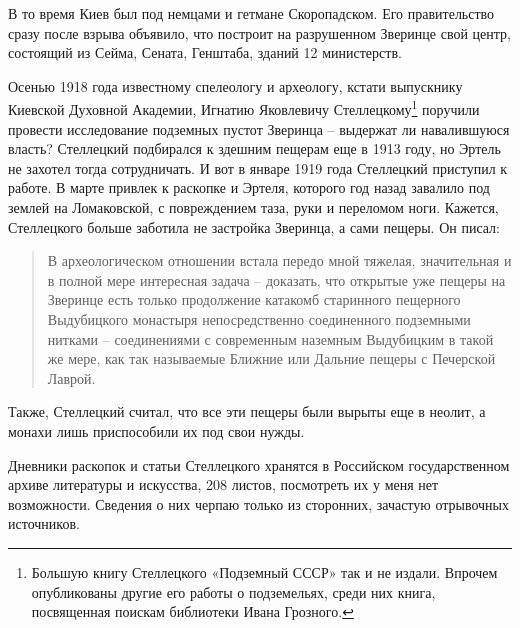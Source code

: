 В то время Киев был под немцами и гетмане Скоропадском. Его правительство сразу после взрыва объявило, что построит на разрушенном Зверинце свой центр, состоящий из Сейма, Сената, Генштаба, зданий 12 министерств.

Осенью 1918 года известному спелеологу и археологу, кстати выпускнику Киевской Духовной Академии, Игнатию Яковлевичу Стеллецкому\footnote{Большую книгу Стеллецкого «Подземный СССР» так и не издали. Впрочем опубликованы другие его работы о подземельях, среди них книга, посвященная поискам библиотеки Ивана Грозного.} поручили провести исследование подземных пустот Зверинца – выдержат ли навалившуюся власть? Стеллецкий подбирался к здешним пещерам еще в 1913 году, но Эртель не захотел тогда сотрудничать. И вот в январе 1919 года Стеллецкий приступил к работе. В марте привлек к раскопке и Эртеля, которого год назад завалило под землей на Ломаковской, с повреждением таза, руки и переломом ноги. Кажется, Стеллецкого больше заботила не застройка Зверинца, а сами пещеры. Он писал:

\begin{quotation}
В археологическом отношении встала передо мной тяжелая, значительная и в полной мере интересная задача – доказать, что открытые уже пещеры на Зверинце есть только продолжение катакомб старинного пещерного Выдубицкого монастыря непосредственно соединенного подземными нитками – соединениями с современным наземным Выдубицким в такой же мере, как так называемые Ближние или Дальние пещеры с Печерской Лаврой.
\end{quotation}

Также, Стеллецкий считал, что все эти пещеры были вырыты еще в неолит, а монахи лишь приспособили их под свои нужды.

Дневники раскопок и статьи Стеллецкого хранятся в Российском государственном архиве литературы и искусства, 208 листов, посмотреть их у меня нет возможности. Сведения о них черпаю только из сторонних, зачастую отрывочных источников.



